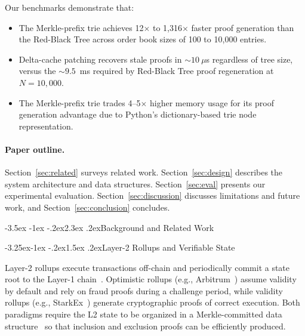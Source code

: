 \documentclass[letterpaper,twocolumn,10pt]{article}
\makeatletter
\renewcommand{\section}{\@startsection{section}{1}{\z@}%
  {-3.5ex \@plus -1ex \@minus -.2ex}{2.3ex \@plus.2ex}{\normalfont\large\bfseries}}
\renewcommand{\subsection}{\@startsection{subsection}{2}{\z@}%
  {-3.25ex\@plus -1ex \@minus -.2ex}{1.5ex \@plus .2ex}{\normalfont\normalsize\bfseries}}
\makeatother
\begin{document}
Our benchmarks demonstrate that:
\begin{itemize}
  \item The Merkle-prefix trie achieves 12$\times$ to 1{,}316$\times$ faster proof generation than the Red-Black Tree across order book sizes of 100 to 10{,}000 entries.
  \item Delta-cache patching recovers stale proofs in ${\sim}10~\mu$s regardless of tree size, versus the ${\sim}9.5$~ms required by Red-Black Tree proof regeneration at $N = 10{,}000$.
  \item The Merkle-prefix trie trades 4--5$\times$ higher memory usage for its proof generation advantage due to Python's dictionary-based trie node representation.
\end{itemize}

\paragraph{Paper outline.}
Section~\ref{sec:related} surveys related work.
Section~\ref{sec:design} describes the system architecture and data structures.
Section~\ref{sec:eval} presents our experimental evaluation.
Section~\ref{sec:discussion} discusses limitations and future work, and Section~\ref{sec:conclusion} concludes.

\section{Background and Related Work}
\label{sec:related}

\subsection{Layer-2 Rollups and Verifiable State}

Layer-2 rollups execute transactions off-chain and periodically commit a state root to the Layer-1 chain~\cite{buterin2021rollups}.
Optimistic rollups (e.g., Arbitrum~\cite{kalodner2018arbitrum}) assume validity by default and rely on fraud proofs during a challenge period, while validity rollups (e.g., StarkEx~\cite{starkware2020starkex}) generate cryptographic proofs of correct execution.
Both paradigms require the L2 state to be organized in a Merkle-committed data structure~\cite{merkle1988digital} so that inclusion and exclusion proofs can be efficiently produced.
\end{document}
